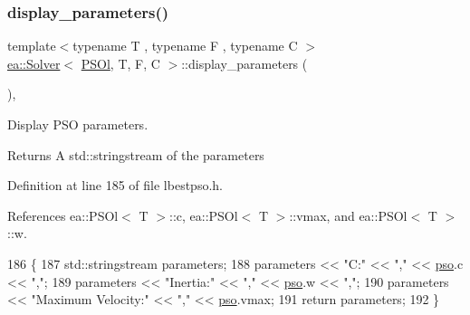 \subsubsection{\texorpdfstring{display\+\_\+parameters()}{display\_parameters()}}
{\footnotesize\ttfamily template$<$typename T , typename F , typename C $>$ \\
\hyperlink{classea_1_1_solver}{ea\+::\+Solver}$<$ \hyperlink{structea_1_1_p_s_ol}{P\+S\+Ol}, T, F, C $>$\+::display\+\_\+parameters (\begin{DoxyParamCaption}{ }\end{DoxyParamCaption})\hspace{0.3cm}{\ttfamily [inline]}, {\ttfamily [private]}}



Display P\+SO parameters. 

\begin{DoxyReturn}{Returns}
A std\+::stringstream of the parameters 
\end{DoxyReturn}


Definition at line 185 of file lbestpso.\+h.



References ea\+::\+P\+S\+Ol$<$ T $>$\+::c, ea\+::\+P\+S\+Ol$<$ T $>$\+::vmax, and ea\+::\+P\+S\+Ol$<$ T $>$\+::w.


\begin{DoxyCode}
186         \{
187             std::stringstream parameters;
188             parameters << \textcolor{stringliteral}{"C:"} << \textcolor{stringliteral}{","} << \hyperlink{classea_1_1_solver_3_01_p_s_ol_00_01_t_00_01_f_00_01_c_01_4_a3098f083ef04a0ce7ae0eef22dd80442}{pso}.c << \textcolor{stringliteral}{","};
189             parameters << \textcolor{stringliteral}{"Inertia:"} << \textcolor{stringliteral}{","} << \hyperlink{classea_1_1_solver_3_01_p_s_ol_00_01_t_00_01_f_00_01_c_01_4_a3098f083ef04a0ce7ae0eef22dd80442}{pso}.w << \textcolor{stringliteral}{","};
190             parameters << \textcolor{stringliteral}{"Maximum Velocity:"} << \textcolor{stringliteral}{","} << \hyperlink{classea_1_1_solver_3_01_p_s_ol_00_01_t_00_01_f_00_01_c_01_4_a3098f083ef04a0ce7ae0eef22dd80442}{pso}.vmax;
191             \textcolor{keywordflow}{return} parameters;
192         \}
\end{DoxyCode}
\mbox{\label{classea_1_1_solver_3_01_p_s_ol_00_01_t_00_01_f_00_01_c_01_4_a21df6a4efb4d058ecd3bc342e318b59a}} 
